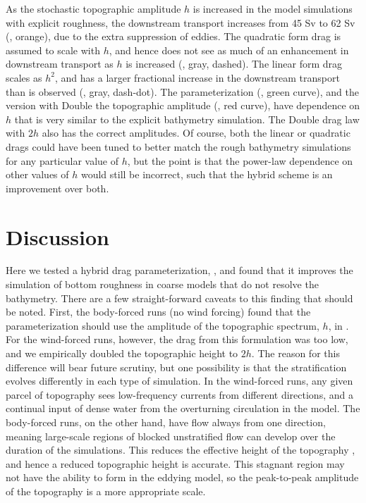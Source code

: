 \documentclass[twocol]{ametsocV5}
\begin{document}
As the stochastic topographic amplitude $h$ is increased in the model simulations with explicit roughness, the downstream transport increases from 45 Sv to 62 Sv (, orange), due to the extra suppression of eddies.  The quadratic form drag is assumed to scale with $h$, and hence does not see as much of an enhancement in downstream transport as $h$ is increased (, gray, dashed).  The linear form drag scales as $h^2$, and has a larger fractional increase in the downstream transport than is observed (, gray, dash-dot).  The parameterization (, green curve), and the version with {\sc Double} the topographic amplitude (, red curve),  have  dependence on $h$ that is very similar to the explicit bathymetry simulation. The {\sc Double} drag law with $2h$ also has the correct amplitudes.  Of course, both the linear or quadratic drags could have been tuned to better match the rough bathymetry simulations for any particular value of $h$, but the point is that the power-law dependence on other values of $h$ would still be incorrect, such that the hybrid scheme is an improvement over both.

\clearpage
\section{Discussion}

Here we tested a  hybrid drag parameterization, , and found that it improves the simulation of bottom roughness in coarse models that do not resolve the bathymetry.  There are a few straight-forward caveats to this finding that should be noted.  First, the body-forced runs (no wind forcing) found that the parameterization  should use the amplitude of the topographic spectrum, $h$, in . For the wind-forced runs, however, the drag from this formulation was too low, and we empirically doubled the topographic height to $2h$.  The reason for this difference will bear future scrutiny, but one possibility is that the stratification evolves differently in each type of simulation.  In the wind-forced runs, any given parcel of topography sees low-frequency currents from different directions, and a continual input of dense water from the overturning circulation in the model.  The body-forced runs, on the other hand, have flow always from one direction, meaning large-scale regions of blocked unstratified flow can develop over the duration of the simulations.  This reduces the effective height of the topography \citep[e.g.][]{aguilarsutherland06}, and hence a reduced topographic height is accurate.  This stagnant region may not have the ability to form in the eddying model, so the peak-to-peak amplitude of the topography is a more appropriate scale.
\end{document}
